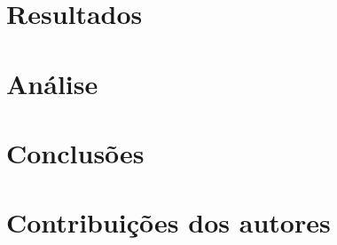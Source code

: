 \documentclass{report}
\begin{document}
\chapter{Resultados}
\label{chap.resultados}

\chapter{Análise}
\label{chap.analise}


\chapter{Conclusões}
\label{chap.conclusao}

\chapter*{Contribuições dos autores}
\end{document}
